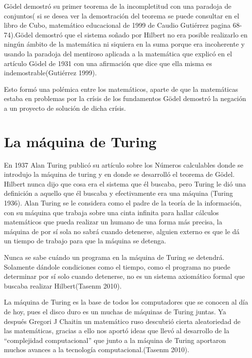 \documentclass{article}
\begin{document}
Gödel demostró su primer teorema de la incompletitud con una paradoja de conjuntos( si se desea ver la demostración del teorema se puede consultar en el libro de Cubo, matemático educacional de 1999 de Caudio Gutiérrez pagina 68-74).Gödel demostró que el sistema soñado por Hilbert no era posible realizarlo en ningún ámbito de la matemática ni siquiera en la suma porque era incoherente y usando la paradoja  del mentiroso aplicada a la matemática que explicó en el artículo Gödel de 1931 con una afirmación que dice que ella misma es indemostrable(Gutiérrez  1999).
\vspace{10pt}

Esto formó una polémica entre los matemáticos, aparte de que la matemáticas estaba en problemas por la crísis de los fundamentos Gödel demostró la negación a un proyecto de solución de dicha crísis.

\section{La máquina de Turing}
En 1937 Alan Turing publicó su artículo sobre los Números calculables donde se introdujo la máquina de turing y en donde se desarrolló el teorema de Gödel. Hilbert nunca dijo que cosa era el sistema que él buscaba, pero Turing le dió una definición a aquello que él buscaba y efectivamente era una máquina (Turing 1936).
Alan Turing se le considera como el padre de la teoría de la información, con su máquina que trabaja sobre una cinta infinita para hallar cálculos matemáticos que pueda realizar un humano de una forma más precisa, la máquina de por sí sola no sabrá cuando detenerse, alguien externo es que le dá un tiempo de trabajo para que la máquina se detenga.

\vspace{10pt}

Nunca se sabe cuándo un programa en la máquina de Turing se detendrá. Solamente dándole condiciones como el tiempo, como el programa no puede determinar por sí solo cuando detenerse, no es un sistema axiomático formal que buscaba realizar Hilbert(Tasenm 2010).

\vspace{10pt}
La máquina de Turing es la base de todos los computadores que se conocen al día de hoy, pues el disco duro es un muchas de máquinas de Turing juntas.
Ya después Gregori J Chaitin un matemático ruso descubrió cierta aleatoriedad de las matemáticas, gracias a ello nos aportó ideas que llevó al desarrollo de la “complejidad computacional” que junto a la máquina de Turing aportaron muchos avances a la tecnología computacional.(Tasenm 2010).
\end{document}
